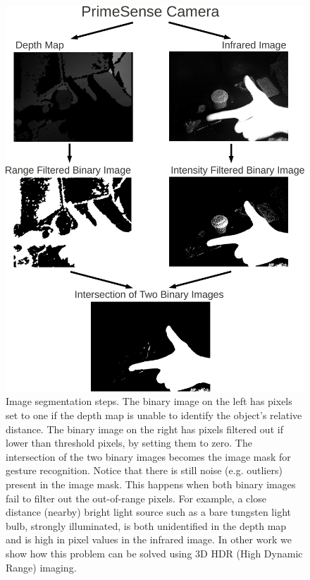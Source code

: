 \begin{figure} 
\centering 
\includegraphics[width=0.8\columnwidth]{ch5/figs/crop_segmentation.pdf} 
\caption{Image segmentation steps. The binary image on the left has pixels
set to one if the depth map is unable to identify the object's relative
distance. The binary image on the right has pixels filtered out if lower than
threshold pixels, by setting them to zero. The intersection of the two
binary images becomes the image mask for gesture recognition. Notice that
there is still noise (e.g. outliers) present in the image mask. This happens
when both binary images fail to filter out the out-of-range pixels. For
example, a close distance (nearby) bright light source such as a bare tungsten
light bulb, strongly illuminated,
is both unidentified in the
depth map and is high in pixel values in the infrared image.
In other work we show how this problem can be solved using 3D HDR (High Dynamic
Range) imaging.}
\label{image_segmentation} 
\end{figure}

